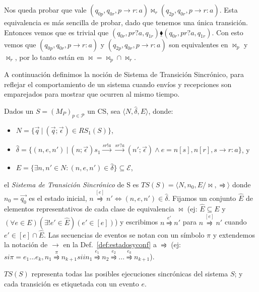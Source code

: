 \begin{example}
Nos queda probar que vale $(q_{0p}, q_{0r}, p \rightarrow r:a) \bowtie_r (q_{2p}, q_{0r}, p \rightarrow r:a)$. Esta equivalencia es más sencilla de probar, dado que tenemos una única transición. Entonces vemos que es trivial que $(q_{0r}, pr?a, q_{1r}) \underline{\blacklozenge} (q_{0r}, pr?a, q_{1r})$. Con esto vemos que $(q_{0p}, q_{0r}, p \rightarrow r:a)$ y $(q_{2p}, q_{0r}, p \rightarrow r:a)$ son equivalentes en $\bowtie_p$ y $\bowtie_r$, por lo tanto están en $\bowtie = \bowtie_p \cap \bowtie_r$.
\end{example} 

A continuación definimos la noción de Sistema de Transición Sincrónico, para reflejar el comportamiento de un sistema cuando envíos y recepciones son emparejados para mostrar que ocurren al mismo tiempo.

\begin{definition} Dados un $S = (M_P)_{p \in \mathcal{P}}$ un CS, sea $\langle N,\hat{\delta}, E \rangle$, donde: 
\begin{itemize}
    \item[] $N = \{\overrightarrow{q} \ | \ (\overrightarrow{q}; \overrightarrow{\epsilon}) \in RS_1(S) \}$,
    \item[] $\hat{\delta}= \{(n, e, n') \ | \ (n;\overrightarrow{\epsilon}) s_1 \overset{sr!a}{\longrightarrow}\overset{sr?a}{\longrightarrow} (n';\overrightarrow{\epsilon})	\land e= n[s], n[r], s \rightarrow r:a \}$, y
    \item[] $ E = \{ \exists n, n' \in N : (n,e,n') \in \hat{\delta}\} \subseteq \mathcal{E}$,
\end{itemize}
   el \emph{Sistema de Transición Sincrónico} de S es $TS(S)= \langle N, n_0, E/ \bowtie,\rightrightharpoons \rangle$ donde $n_0= \overrightarrow{q_0} $ es el estado inicial, $n \overset{[e]}{\rightrightharpoons} n' \iff (n,e,n') \in \hat{\delta}$. Fijamos un conjunto $\hat{E}$ de elementos representativos de cada clase de equivalencia $\bowtie$ (ej: $\hat{E} \subseteq E$ y $\left(\forall e \in E\right)\left(\exists!e' \in \hat{E}\right)\left(e' \in [e] \right)$) y escribimos $n \overset{e'}{\rightrightharpoons} n'$ para $ n \overset{[e]}{\rightrightharpoons} n'$ cuando $ e' \in [e] \cap \hat{E} $. Las secuencias de eventos se notan con un símbolo $\pi$ y extendemos la notación de $ \rightarrow$ en la Def.~\ref{def:estadosyconf} a $\rightrightharpoons$ (ej: $si \pi = e_1 ...e_k, n_1 \overset{\pi}{\rightrightharpoons}n_{k+1} sii n_1 \overset{e_1}{\rightrightharpoons} n_2 \overset{e_2}{\rightrightharpoons}...\overset{e_k}{\rightrightharpoons} n_{k+1}$).

$TS(S)$ representa todas las posibles ejecuciones sincrónicas del sistema $S$; y cada transición es etiquetada con un evento $e$.
\end{definition}


